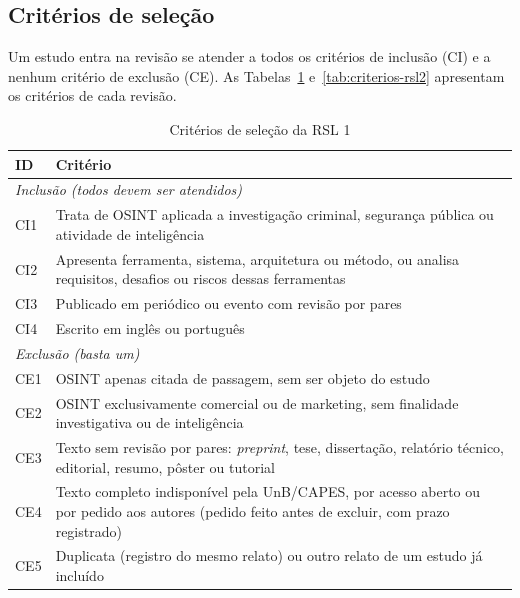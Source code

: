 \subsection{Critérios de seleção}

Um estudo entra na revisão se atender a todos os critérios de inclusão (CI) e
a nenhum critério de exclusão (CE). As Tabelas~\ref{tab:criterios-rsl1}
e~\ref{tab:criterios-rsl2} apresentam os critérios de cada revisão.

\begin{table}[htbp]
	\centering
	\caption{Critérios de seleção da RSL 1}
	\label{tab:criterios-rsl1}
	\small
	\begin{tabular}{p{1cm}p{13.4cm}}
		\hline
		\textbf{ID} & \textbf{Critério} \\
		\hline
		\multicolumn{2}{l}{\textit{Inclusão (todos devem ser atendidos)}} \\
		CI1 & Trata de OSINT aplicada a investigação criminal, segurança
		pública ou atividade de inteligência \\
		CI2 & Apresenta ferramenta, sistema, arquitetura ou método, ou analisa
		requisitos, desafios ou riscos dessas ferramentas \\
		CI3 & Publicado em periódico ou evento com revisão por pares \\
		CI4 & Escrito em inglês ou português \\
		\hline
		\multicolumn{2}{l}{\textit{Exclusão (basta um)}} \\
		CE1 & OSINT apenas citada de passagem, sem ser objeto do estudo \\
		CE2 & OSINT exclusivamente comercial ou de marketing, sem finalidade
		investigativa ou de inteligência \\
		CE3 & Texto sem revisão por pares: \textit{preprint}, tese,
		dissertação, relatório técnico, editorial, resumo, pôster ou tutorial
		\\
		CE4 & Texto completo indisponível pela UnB/CAPES, por acesso aberto ou
		por pedido aos autores (pedido feito antes de excluir, com prazo
		registrado) \\
		CE5 & Duplicata (registro do mesmo relato) ou outro relato de um
		estudo já incluído \\
		\hline
	\end{tabular}
\end{table}

